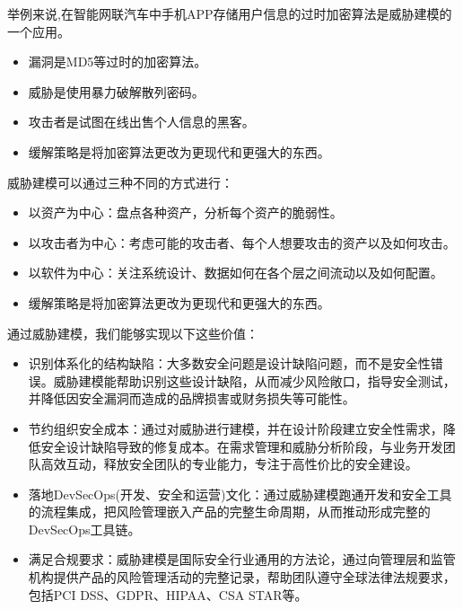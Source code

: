 举例来说,在智能网联汽车中手机APP存储用户信息的过时加密算法是威胁建模的一个应用。
\begin{itemize}
    \item 漏洞是MD5等过时的加密算法。
    \item 威胁是使用暴力破解散列密码。
    \item 攻击者是试图在线出售个人信息的黑客。
    \item 缓解策略是将加密算法更改为更现代和更强大的东西。
  \end{itemize}
威胁建模可以通过三种不同的方式进行：
\begin{itemize}
  \item 以资产为中心：盘点各种资产，分析每个资产的脆弱性。
  \item 以攻击者为中心：考虑可能的攻击者、每个人想要攻击的资产以及如何攻击。
  \item 以软件为中心：关注系统设计、数据如何在各个层之间流动以及如何配置。
  \item 缓解策略是将加密算法更改为更现代和更强大的东西。
\end{itemize} 
通过威胁建模，我们能够实现以下这些价值：
\begin{itemize}
    \item 识别体系化的结构缺陷：大多数安全问题是设计缺陷问题，而不是安全性错误。威胁建模能帮助识别这些设计缺陷，从而减少风险敞口，指导安全测试，并降低因安全漏洞而造成的品牌损害或财务损失等可能性。
    \item 节约组织安全成本：通过对威胁进行建模，并在设计阶段建立安全性需求，降低安全设计缺陷导致的修复成本。在需求管理和威胁分析阶段，与业务开发团队高效互动，释放安全团队的专业能力，专注于高性价比的安全建设。
    \item 落地DevSecOps(开发、安全和运营)文化：通过威胁建模跑通开发和安全工具的流程集成，把风险管理嵌入产品的完整生命周期，从而推动形成完整的DevSecOps工具链。
    \item 满足合规要求：威胁建模是国际安全行业通用的方法论，通过向管理层和监管机构提供产品的风险管理活动的完整记录，帮助团队遵守全球法律法规要求，包括PCI DSS、GDPR、HIPAA、CSA STAR等。
  \end{itemize}



